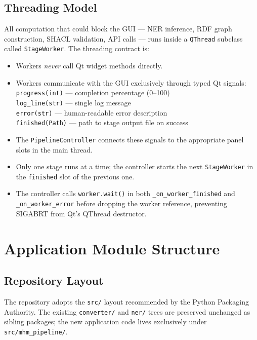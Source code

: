 \documentclass[12pt]{article}
\newcommand{\filepath}[1]{\texttt{\small #1}}
\newcommand{\code}[1]{\texttt{#1}}
\begin{document}
\subsection{Threading Model}

All computation that could block the GUI --- NER inference, RDF graph construction, SHACL validation, API calls --- runs inside a \code{QThread} subclass called \code{StageWorker}. The threading contract is:

\begin{itemize}
\item Workers \emph{never} call Qt widget methods directly.
\item Workers communicate with the GUI exclusively through typed Qt signals:\\
  \code{progress(int)} --- completion percentage (0--100)\\
  \code{log\_line(str)} --- single log message\\
  \code{error(str)} --- human-readable error description\\
  \code{finished(Path)} --- path to stage output file on success
\item The \code{PipelineController} connects these signals to the appropriate panel slots in the main thread.
\item Only one stage runs at a time; the controller starts the next \code{StageWorker} in the \code{finished} slot of the previous one.
\item The controller calls \code{worker.wait()} in both \code{\_on\_worker\_finished} and \code{\_on\_worker\_error} before dropping the worker reference, preventing SIGABRT from Qt's QThread destructor.
\end{itemize}


\section{Application Module Structure}
\label{sec:modules}

\subsection{Repository Layout}

The repository adopts the \code{src/} layout recommended by the Python Packaging Authority. The existing \filepath{converter/} and \filepath{ner/} trees are preserved unchanged as sibling packages; the new application code lives exclusively under \filepath{src/mhm\_pipeline/}.
\end{document}
